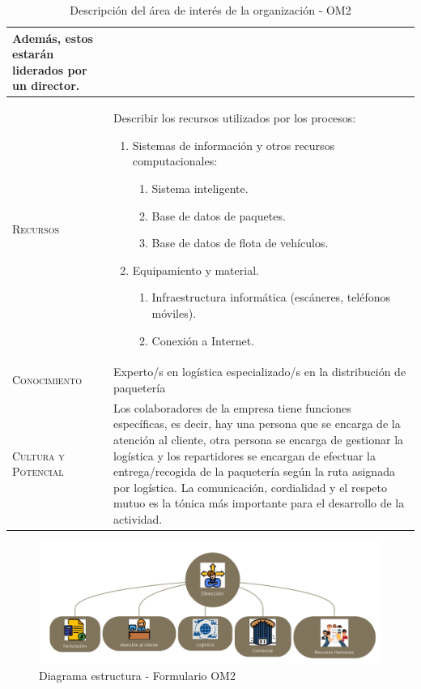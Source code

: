 \begin{table}[H]
{\begin{tabularx}{\textwidth}{|l|X|}
      Además, estos estarán liderados por un director. \\ 
      \hline
      \textsc{Recursos} &  Describir los recursos utilizados por los procesos:
      \begin{enumerate}
          \item Sistemas de información y otros recursos computacionales:
          \begin{enumerate}
            \item Sistema inteligente.
            \item Base de datos de paquetes.
            \item Base de datos de flota de vehículos.
          \end{enumerate}
          \item Equipamiento y material.
          \begin{enumerate}
            \item Infraestructura informática (escáneres, teléfonos móviles).
            \item Conexión a Internet.
          \end{enumerate}
      \end{enumerate} \\ 
      \hline
      \textsc{Conocimiento} &  Experto/s en logística especializado/s en la distribución de paquetería \\ 
      \hline
      \textsc{Cultura y Potencial} &  Los colaboradores de la empresa tiene funciones específicas, es decir, hay una persona que se encarga de la atención al cliente, otra persona se encarga de gestionar la logística y los repartidores se encargan de efectuar la entrega/recogida de la paquetería según la ruta asignada por logística. La comunicación, cordialidad y el respeto mutuo es la tónica más importante para el desarrollo de la actividad. \\ 
      \hline
    \end{tabularx}
  }
  \caption{\label{tab:OM2}Descripción del área de interés de la organización - OM2}
\end{table}

\begin{figure}[H]
	\centering
	\includegraphics[scale=0.50]{imaxes/Organigrama.png}
	\caption{\label{fig:diagramaEstructura}Diagrama estructura - Formulario OM2}
\end{figure}

